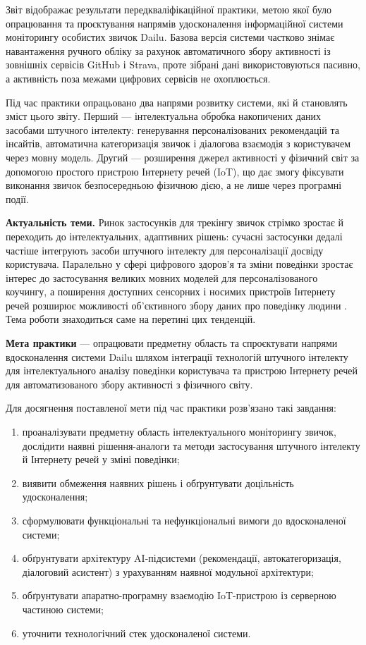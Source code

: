 
Звіт відображає результати передкваліфікаційної практики, метою якої було
опрацювання та проєктування напрямів удосконалення інформаційної системи моніторингу
особистих звичок Dailu. Базова версія системи частково знімає навантаження ручного обліку за
рахунок автоматичного збору активності із зовнішніх сервісів GitHub і Strava, проте зібрані
дані використовуються пасивно, а активність поза межами цифрових сервісів не охоплюється.

Під час практики опрацьовано два напрями розвитку системи, які й становлять зміст цього звіту.
Перший — інтелектуальна обробка накопичених даних засобами штучного інтелекту: генерування
персоналізованих рекомендацій та інсайтів, автоматична категоризація звичок і діалогова
взаємодія з користувачем через мовну модель. Другий — розширення джерел активності у фізичний
світ за допомогою простого пристрою Інтернету речей (IoT), що дає змогу фіксувати виконання
звичок безпосередньою фізичною дією, а не лише через програмні події.

\textbf{Актуальність теми.} Ринок застосунків для трекінгу звичок стрімко зростає й переходить
до інтелектуальних, адаптивних рішень: сучасні застосунки дедалі частіше інтегрують засоби
штучного інтелекту для персоналізації досвіду користувача. Паралельно у сфері цифрового
здоров'я та зміни поведінки зростає інтерес до застосування великих мовних моделей для
персоналізованого коучингу, а поширення доступних сенсорних і носимих пристроїв Інтернету речей
розширює можливості об'єктивного збору даних про поведінку людини . Тема
роботи знаходиться саме на перетині цих тенденцій.

\textbf{Мета практики} — опрацювати предметну область та спроєктувати напрями вдосконалення
системи Dailu шляхом інтеграції технологій штучного інтелекту для інтелектуального аналізу
поведінки користувача та пристрою Інтернету речей для автоматизованого збору активності з
фізичного світу.

Для досягнення поставленої мети під час практики розв'язано такі завдання:

\begin{enumerate}[noitemsep, topsep=2pt, leftmargin=*, label=\arabic*)]
    \item проаналізувати предметну область інтелектуального моніторингу звичок, дослідити наявні рішення-аналоги та методи застосування штучного інтелекту й Інтернету речей у зміні поведінки;
    \item виявити обмеження наявних рішень і обґрунтувати доцільність удосконалення;
    \item сформулювати функціональні та нефункціональні вимоги до вдосконаленої системи;
    \item обґрунтувати архітектуру AI-підсистеми (рекомендації, автокатегоризація, діалоговий асистент) з урахуванням наявної модульної архітектури;
    \item обґрунтувати апаратно-програмну взаємодію IoT-пристрою із серверною частиною системи;
    \item уточнити технологічний стек удосконаленої системи.
\end{enumerate}

